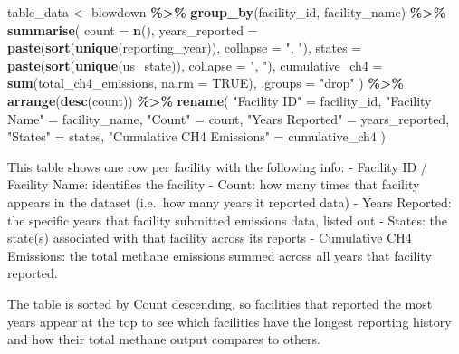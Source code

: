 \documentclass[
]{article}
\newenvironment{Shaded}{\begin{snugshade}}{\end{snugshade}}
\newcommand{\AttributeTok}[1]{\textcolor[rgb]{0.13,0.29,0.53}{#1}}
\newcommand{\ConstantTok}[1]{\textcolor[rgb]{0.56,0.35,0.01}{#1}}
\newcommand{\FunctionTok}[1]{\textcolor[rgb]{0.13,0.29,0.53}{\textbf{#1}}}
\newcommand{\NormalTok}[1]{#1}
\newcommand{\OtherTok}[1]{\textcolor[rgb]{0.56,0.35,0.01}{#1}}
\newcommand{\SpecialCharTok}[1]{\textcolor[rgb]{0.81,0.36,0.00}{\textbf{#1}}}
\newcommand{\StringTok}[1]{\textcolor[rgb]{0.31,0.60,0.02}{#1}}
\begin{document}
\begin{Shaded}
\begin{Highlighting}[]
\NormalTok{table\_data }\OtherTok{\textless{}{-}}\NormalTok{ blowdown }\SpecialCharTok{\%\textgreater{}\%}
  \FunctionTok{group\_by}\NormalTok{(facility\_id, facility\_name) }\SpecialCharTok{\%\textgreater{}\%}
  \FunctionTok{summarise}\NormalTok{(}
    \AttributeTok{count          =} \FunctionTok{n}\NormalTok{(),}
    \AttributeTok{years\_reported =} \FunctionTok{paste}\NormalTok{(}\FunctionTok{sort}\NormalTok{(}\FunctionTok{unique}\NormalTok{(reporting\_year)), }\AttributeTok{collapse =} \StringTok{", "}\NormalTok{),}
    \AttributeTok{states         =} \FunctionTok{paste}\NormalTok{(}\FunctionTok{sort}\NormalTok{(}\FunctionTok{unique}\NormalTok{(us\_state)), }\AttributeTok{collapse =} \StringTok{", "}\NormalTok{),}
    \AttributeTok{cumulative\_ch4 =} \FunctionTok{sum}\NormalTok{(total\_ch4\_emissions, }\AttributeTok{na.rm =} \ConstantTok{TRUE}\NormalTok{),}
    \AttributeTok{.groups =} \StringTok{"drop"}
\NormalTok{  ) }\SpecialCharTok{\%\textgreater{}\%}
  \FunctionTok{arrange}\NormalTok{(}\FunctionTok{desc}\NormalTok{(count)) }\SpecialCharTok{\%\textgreater{}\%}
  \FunctionTok{rename}\NormalTok{(}
    \StringTok{"Facility ID"}              \OtherTok{=}\NormalTok{ facility\_id,}
    \StringTok{"Facility Name"}            \OtherTok{=}\NormalTok{ facility\_name,}
    \StringTok{"Count"}                    \OtherTok{=}\NormalTok{ count,}
    \StringTok{"Years Reported"}           \OtherTok{=}\NormalTok{ years\_reported,}
    \StringTok{"States"}                   \OtherTok{=}\NormalTok{ states,}
    \StringTok{"Cumulative CH4 Emissions"} \OtherTok{=}\NormalTok{ cumulative\_ch4}
\NormalTok{  )}
\end{Highlighting}
\end{Shaded}

This table shows one row per facility with the following info: -
Facility ID / Facility Name: identifies the facility - Count: how many
times that facility appears in the dataset (i.e.~how many years it
reported data) - Years Reported: the specific years that facility
submitted emissions data, listed out - States: the state(s) associated
with that facility across its reports - Cumulative CH4 Emissions: the
total methane emissions summed across all years that facility reported.

The table is sorted by Count descending, so facilities that reported the
most years appear at the top to see which facilities have the longest
reporting history and how their total methane output compares to others.
\end{document}
